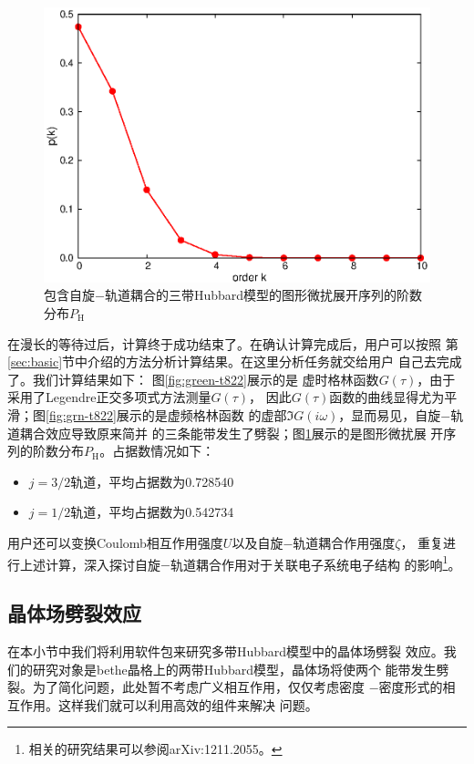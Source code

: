 \begin{figure}
\centering
\includegraphics{figure/hist-t822.eps}
\caption{包含自旋$-$轨道耦合的三带Hubbard模型的图形微扰展开序列的阶数分布$P_{\text{H}}$} 
\label{fig:hist-t822}
\end{figure}

在漫长的等待过后，计算终于成功结束了。在确认计算完成后，用户可以按照
第\ref{sec:basic}节中介绍的方法分析计算结果。在这里分析任务就交给用户
自己去完成了。我们计算结果如下： 图\ref{fig:green-t822}展示的是
虚时格林函数$G(\tau)$，由于采用了Legendre正交多项式方法测量$G(\tau)$，
因此$G(\tau)$函数的曲线显得尤为平滑；图\ref{fig:grn-t822}展示的是虚频格林函数
的虚部$\Im G(i\omega)$，显而易见，自旋$-$轨道耦合效应导致原来简并
的三条能带发生了劈裂；图\ref{fig:hist-t822}展示的是图形微扰展
开序列的阶数分布$P_{\text{H}}$。占据数情况如下：

\begin{itemize}
\item $j=3/2$轨道，平均占据数为0.728540
\item $j=1/2$轨道，平均占据数为0.542734
\end{itemize}

用户还可以变换Coulomb相互作用强度$U$以及自旋$-$轨道耦合作用强度$\zeta$，
重复进行上述计算，深入探讨自旋$-$轨道耦合作用对于关联电子系统电子结构
的影响\footnote{相关的研究结果可以参阅{\color{red}arXiv:1211.2055}。}。

\subsection{晶体场劈裂效应}
\label{subsec:cfs}

在本小节中我们将利用{\iqist}软件包来研究多带Hubbard模型中的晶体场劈裂
效应。我们的研究对象是bethe晶格上的两带Hubbard模型，晶体场将使两个
能带发生劈裂。为了简化问题，此处暂不考虑广义相互作用，仅仅考虑密度
$-$密度形式的相互作用。这样我们就可以利用高效的{\azalea}组件来解决
问题。

